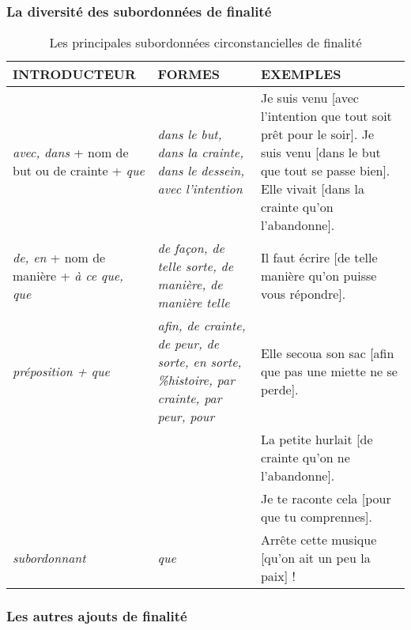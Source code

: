 \documentclass[UTF8]{report}
\begin{document}
\subsubsection{La diversité des subordonnées de finalité}


\begin{table}[H]
    \centering
    \small
    \begin{adjustbox}{max width =\textwidth}
        \begin{tabular}{|>{\RaggedRight}p{3cm}|p{6cm}|>{\RaggedRight}p{6cm}|}
        \hline
        \rowcolor{cyan!20}
        \textbf{INTRODUCTEUR} & \textbf{FORMES} & \textbf{EXEMPLES} \\
        \hline
        \textit{avec, dans} + nom de but ou de crainte + \textit{que} & \textit{dans le but, dans la crainte, dans le dessein, avec l'intention} & Je suis venu [avec l'intention que tout soit prêt pour le soir]. 
        \newline Je suis venu [dans le but que tout se passe bien]. 
        \newline Elle vivait [dans la crainte qu'on l'abandonne]. \\
        \hline
        \textit{de, en} + nom de manière + \textit{à ce que, que} & \textit{de façon, de telle sorte, de manière, de manière telle} & Il faut écrire [de telle manière qu'on puisse vous répondre]. \\
        \hline
        \textit{préposition + que} & \textit{afin, de crainte, de peur, de sorte, en sorte, \%histoire, par crainte, par peur, pour} & Elle secoua son sac [afin que pas une miette ne se perde]. \\
        & & La petite hurlait [de crainte qu'on ne l'abandonne]. \\
        & & Je te raconte cela [pour que tu comprennes]. \\
        \hline
        \textit{subordonnant} & \textit{que} & Arrête cette musique [qu'on ait un peu la paix] ! \\
        \hline
        \end{tabular}
    \end{adjustbox}
    \caption{Les principales subordonnées circonstancielles de finalité}
\end{table}

\subsubsection{Les autres ajouts de finalité}
\end{document}
